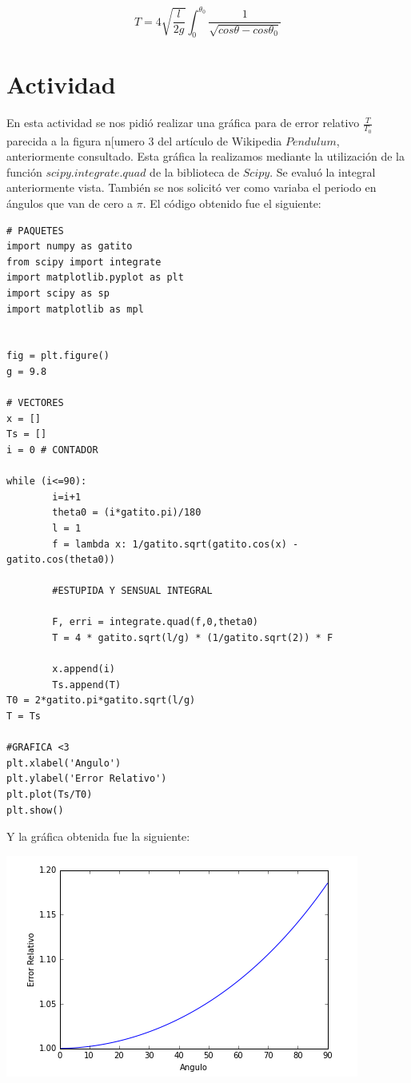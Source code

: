 \documentclass[12pt,letterpaper]{article}
\begin{document}
$$ T = 4\sqrt{\frac{l}{2g}} \int^{\theta_0}_0 \frac{1}{\sqrt{cos\theta - cos\theta_0}} $$

\section*{Actividad}

En esta actividad se nos pidió realizar una gráfica para de error relativo $\frac{T}{T_0}$ parecida a la figura n[umero 3 del artículo de Wikipedia $Pendulum$\cite{1},  anteriormente consultado. Esta gráfica la realizamos mediante la utilización de la función $scipy.integrate.quad$ de la biblioteca de $Scipy$. Se evaluó la integral anteriormente vista. También se nos solicitó ver como variaba el periodo en ángulos que van de cero a $\pi$.  El código obtenido fue el siguiente:

\begin{verbatim}
# PAQUETES
import numpy as gatito
from scipy import integrate
import matplotlib.pyplot as plt
import scipy as sp
import matplotlib as mpl
 

fig = plt.figure()
g = 9.8

# VECTORES
x = []
Ts = []
i = 0 # CONTADOR
 
while (i<=90):
        i=i+1 
        theta0 = (i*gatito.pi)/180 
        l = 1 
        f = lambda x: 1/gatito.sqrt(gatito.cos(x) - gatito.cos(theta0)) 
        
        #ESTUPIDA Y SENSUAL INTEGRAL
        
        F, erri = integrate.quad(f,0,theta0)
        T = 4 * gatito.sqrt(l/g) * (1/gatito.sqrt(2)) * F
       
        x.append(i)
        Ts.append(T)
T0 = 2*gatito.pi*gatito.sqrt(l/g)
T = Ts

#GRAFICA <3
plt.xlabel('Angulo') 
plt.ylabel('Error Relativo') 
plt.plot(Ts/T0) 
plt.show() 
\end{verbatim}
Y la gráfica obtenida fue la siguiente: 

\begin{center}

\includegraphics[scale=0.6]{ACTIVIDAD6.png}

\end{center}
\end{document}
